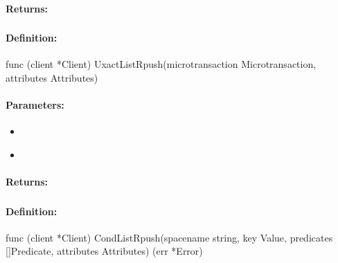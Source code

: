 \paragraph{Returns:}


\pagebreak
\subsubsection{}
\label{api:Go:UxactListRpush}


\paragraph{Definition:}
\begin{gocode}
func (client *Client) UxactListRpush(microtransaction Microtransaction, attributes Attributes)
\end{gocode}

\paragraph{Parameters:}
\begin{itemize}[noitemsep]
\item {}\\

\item {}\\

\end{itemize}

\paragraph{Returns:}


\pagebreak
\subsubsection{}
\label{api:Go:CondListRpush}


\paragraph{Definition:}
\begin{gocode}
func (client *Client) CondListRpush(spacename string, key Value, predicates []Predicate, attributes Attributes) (err *Error)
\end{gocode}

